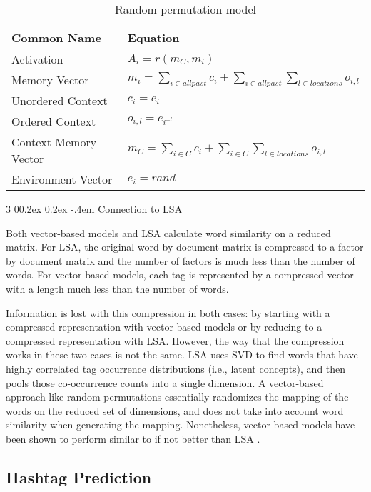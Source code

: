 \documentclass[man,donotrepeattitle]{apa6}
\makeatletter
\renewcommand{\subsubsection}{%
  \@startsection
  {subsubsection}%
  {3}%
  {\parindent}%
  {0\baselineskip \@plus 0.2ex \@minus 0.2ex}%
  {-.4em}%
  {\normalfont\normalsize\bfseries\addperi}}
\makeatother
\begin{document}
\begin{table}[!ht]
  \caption{Random permutation model}
  \label{tabRandPermModel}
  {\tabulinesep=1.2mm
    \begin{tabu}{ll}
      \hline
      Common Name &  Equation \\
      \hline
      Activation &		$A_{i} = r(m_{C},m_{i})$ \\
      Memory Vector &		$m_{i} = \sum_{i \in all past} c_{i} + \sum_{i \in all past} \sum_{l \in locations} o_{i,l}$ \\
      Unordered Context &	$c_{i} = e_{i}$ \\
      Ordered Context &		$o_{i,l} = e_{i^{-l}}$ \\
      Context Memory Vector &	$m_{C} = \sum_{i \in C} c_{i} + \sum_{i \in C} \sum_{l \in locations} o_{i,l}$ \\
      Environment Vector & 	$e_{i} = rand$ \\
      \hline
    \end{tabu}
  }
\end{table}

\subsubsection{Connection to LSA}

Both vector-based models and LSA calculate word similarity on a reduced matrix.
For LSA, the original word by document matrix is compressed to a factor by document matrix and the number of factors is much less than the number of words.
For vector-based models, each tag is represented by a compressed vector with a length much less than the number of words.

Information is lost with this compression in both cases: by starting with a compressed representation with vector-based models or by reducing to a compressed representation with LSA.
However, the way that the compression works in these two cases is not the same.
LSA uses SVD to find words that have highly correlated tag occurrence distributions (i.e., latent concepts), and then pools those co-occurrence counts into a single dimension.
A vector-based approach like random permutations essentially randomizes the mapping of the words on the reduced set of dimensions, and does not take into account word similarity when generating the mapping.
Nonetheless, vector-based models have been shown to perform similar to if not better than LSA \parencites{Sahlgren2008,Jones2007}.

\subsection{Hashtag Prediction}
\end{document}
